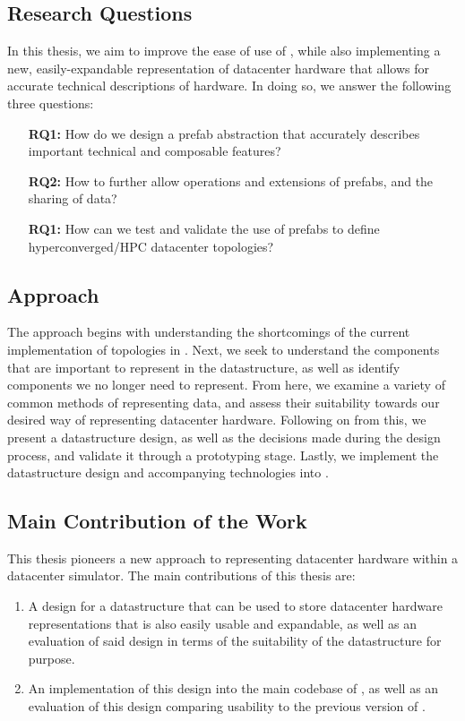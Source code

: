 \documentclass[11pt]{article}
\begin{document}
	\subsection{Research Questions}
		In this thesis, we aim to improve the ease of use of \opendc{}, while also implementing a new, easily-expandable representation of datacenter hardware that allows for accurate technical descriptions of hardware. 
		In doing so, we answer the following three questions:
		\begin{itemize}
			\item [\textbf{RQ1:}] How do we design a prefab abstraction that accurately describes important technical and composable features?
			\item [\textbf{RQ2:}] How to further allow operations and extensions of prefabs, and the sharing of data?
			\item [\textbf{RQ1:}] How can we test and validate the use of prefabs to define hyperconverged/HPC datacenter topologies?
		\end{itemize}
	
	\subsection{Approach}
		The approach begins with understanding the shortcomings of the current implementation of topologies in \opendc{}.
		Next, we seek to understand the components that are important to represent in the datastructure, as well as identify components we no longer need to represent.
		From here, we examine a variety of common methods of representing data, and assess their suitability towards our desired way of representing datacenter hardware.
		Following on from this, we present a datastructure design, as well as the decisions made during the design process, and validate it through a prototyping stage.
		Lastly, we implement the datastructure design and accompanying technologies into \opendc{}.
	
	\subsection{Main Contribution of the Work}
		This thesis pioneers a new approach to representing datacenter hardware within a datacenter simulator.
		The main contributions of this thesis are:
		\begin{enumerate}
			\item A design for a datastructure that can be used to store datacenter hardware representations that is also easily usable and expandable, as well as an evaluation of said design in terms of the suitability of the datastructure for purpose.
			\item An implementation of this design into the main codebase of \opendc{}, as well as an evaluation of this design comparing usability to the previous version of \opendc{}.
		\end{enumerate}
	
\end{document}
